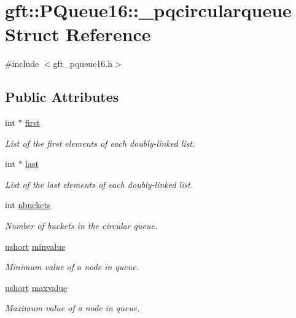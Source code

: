 \hypertarget{structgft_1_1PQueue16_1_1__pqcircularqueue}{\section{gft\-:\-:P\-Queue16\-:\-:\-\_\-pqcircularqueue Struct Reference}
\label{structgft_1_1PQueue16_1_1__pqcircularqueue}
}


{\ttfamily \#include $<$gft\-\_\-pqueue16.\-h$>$}

\subsection*{Public Attributes}
\begin{DoxyCompactItemize}
\item 
int $\ast$ \hyperlink{structgft_1_1PQueue16_1_1__pqcircularqueue_aeda855ff236bb30b8269239931656ed7}{first}
\begin{DoxyCompactList}\small\item\em List of the first elements of each doubly-\/linked list. \end{DoxyCompactList}\item 
int $\ast$ \hyperlink{structgft_1_1PQueue16_1_1__pqcircularqueue_a6a74e64858b82a1b274731c5758ba162}{last}
\begin{DoxyCompactList}\small\item\em List of the last elements of each doubly-\/linked list. \end{DoxyCompactList}\item 
int \hyperlink{structgft_1_1PQueue16_1_1__pqcircularqueue_a04b672c1f097742297f79ca45672f248}{nbuckets}
\begin{DoxyCompactList}\small\item\em Number of buckets in the circular queue. \end{DoxyCompactList}\item 
\hyperlink{namespacegft_a878518cf75338c097e2c8e9b10bfb00d}{ushort} \hyperlink{structgft_1_1PQueue16_1_1__pqcircularqueue_a7cceb7dbbae52c61f53e44735ebb8156}{minvalue}
\begin{DoxyCompactList}\small\item\em Minimum value of a node in queue. \end{DoxyCompactList}\item 
\hyperlink{namespacegft_a878518cf75338c097e2c8e9b10bfb00d}{ushort} \hyperlink{structgft_1_1PQueue16_1_1__pqcircularqueue_acc9c8a89ad23c5a641fee6e38a2b7bd9}{maxvalue}
\begin{DoxyCompactList}\small\item\em Maximum value of a node in queue. \end{DoxyCompactList}\end{DoxyCompactItemize}



